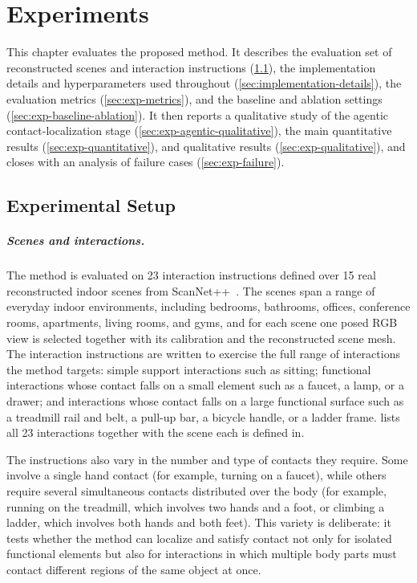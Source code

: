 \chapter{Experiments}
\label{chap:experiments}

This chapter evaluates the proposed method. It describes the evaluation set of reconstructed scenes and interaction instructions (\cref{sec:exp-setup}), the implementation details and hyperparameters used throughout (\cref{sec:implementation-details}), the evaluation metrics (\cref{sec:exp-metrics}), and the baseline and ablation settings (\cref{sec:exp-baseline-ablation}). It then reports a qualitative study of the agentic contact-localization stage (\cref{sec:exp-agentic-qualitative}), the main quantitative results (\cref{sec:exp-quantitative}), and qualitative results (\cref{sec:exp-qualitative}), and closes with an analysis of failure cases (\cref{sec:exp-failure}).

\section{Experimental Setup}
\label{sec:exp-setup}

\paragraph{Scenes and interactions.} The method is evaluated on 23 interaction instructions defined over 15 real reconstructed indoor scenes from ScanNet++~\cite{yeshwanth2023scannetpp}. The scenes span a range of everyday indoor environments, including bedrooms, bathrooms, offices, conference rooms, apartments, living rooms, and gyms, and for each scene one posed RGB view is selected together with its calibration and the reconstructed scene mesh. The interaction instructions are written to exercise the full range of interactions the method targets: simple support interactions such as sitting; functional interactions whose contact falls on a small element such as a faucet, a lamp, or a drawer; and interactions whose contact falls on a large functional surface such as a treadmill rail and belt, a pull-up bar, a bicycle handle, or a ladder frame.  lists all 23 interactions together with the scene each is defined in.

The instructions also vary in the number and type of contacts they require. Some involve a single hand contact (for example, turning on a faucet), while others require several simultaneous contacts distributed over the body (for example, running on the treadmill, which involves two hands and a foot, or climbing a ladder, which involves both hands and both feet). This variety is deliberate: it tests whether the method can localize and satisfy contact not only for isolated functional elements but also for interactions in which multiple body parts must contact different regions of the same object at once.

